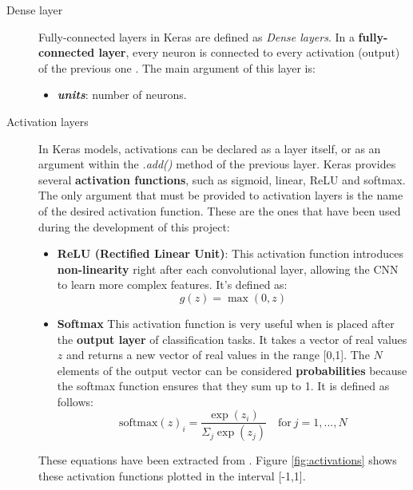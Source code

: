 \begin{description}
	\item[Dense layer] Fully-connected layers in Keras are defined as \textit{Dense layers}. In a \textbf{fully-connected layer}, every neuron is connected to every activation (output) of the previous one \cite{cs231n}. The main argument of this layer is:
	\begin{itemize}
		\item \textbf{\textit{units}}: number of neurons.
	\end{itemize} 
\end{description}

\begin{description}
	\item[Activation layers] In Keras models, activations can be declared as a layer itself, or as an argument within the \textit{.add()} method of the previous layer. Keras provides several \textbf{activation functions}, such as sigmoid, linear, ReLU and softmax. The only argument that must be provided to activation layers is the name of the desired activation function. These are the ones that have been used during the development of this project:
	\begin{itemize}
		\item \textbf{ReLU (Rectified Linear Unit)}: This activation function introduces \textbf{non-linearity} right after each convolutional layer, allowing the CNN to learn more complex features. It's defined as:
		\begin{equation}\label{eq:ReLU}
		g(z)=\max(0,z)
		\end{equation}
		
		\item \textbf{Softmax} This activation function is very useful when is placed after the \textbf{output layer} of classification tasks. It takes a vector of real values $z$ and returns a new vector of real values in the range [0,1]. The $N$ elements of the output vector can be considered \textbf{probabilities} because the softmax function ensures that they sum up to 1. It is defined as follows:
		\begin{equation}\label{eq:SoftMax}
		\mathrm{softmax}(z)_i=\frac{\exp(z_i)}{\Sigma_{j}{\exp(z_j)}} \quad \mathrm{for} \ j=1, ...,N
		\end{equation}
	\end{itemize}
	These equations have been extracted from \cite{Goodfellow-et-al-2016}. Figure \ref{fig:activations} shows these activation functions plotted in the interval [-1,1].


\end{description}
